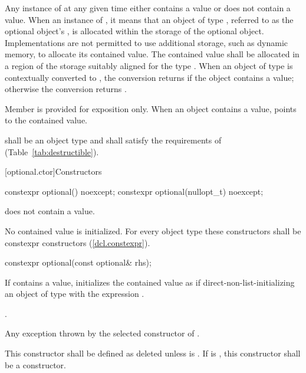 \pnum
Any instance of  at any given time either contains a value or does not contain a value.
When an instance of  ,
it means that an object of type , referred to as the optional object's ,
is allocated within the storage of the optional object.
Implementations are not permitted to use additional storage, such as dynamic memory, to allocate its contained value.
The contained value shall be allocated in a region of the  storage suitably aligned for the type .
When an object of type  is contextually converted to ,
the conversion returns  if the object contains a value;
otherwise the conversion returns .

\pnum
Member  is provided for exposition only. When an  object contains a value,  points to the contained value.

\pnum
{} shall be an object type and shall satisfy the requirements of  (Table~\ref{tab:destructible}).

[optional.ctor]{Constructors}

%
\begin{itemdecl}
constexpr optional() noexcept;
constexpr optional(nullopt_t) noexcept;
\end{itemdecl}

\begin{itemdescr}
\pnum
\postconditions
{} does not contain a value.

\pnum
\remarks
No contained value is initialized.
For every object type  these constructors shall be constexpr constructors (\ref{dcl.constexpr}).
\end{itemdescr}

%
\begin{itemdecl}
constexpr optional(const optional& rhs);
\end{itemdecl}

\begin{itemdescr}
\pnum
\effects
If  contains a value, initializes the contained value as if
direct-non-list-initializing an object of type  with the expression .

\pnum
\postconditions
{}.

\pnum
\throws
Any exception thrown by the selected constructor of .

\pnum
\remarks
This constructor shall be defined as deleted unless
 is .
If  is ,
this constructor shall be a  constructor.
\end{itemdescr}

